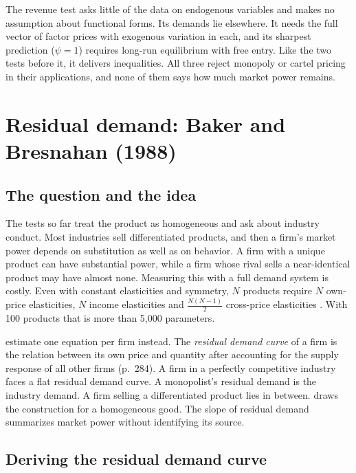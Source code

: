  The revenue test asks little of the data on endogenous variables and makes no
assumption about functional forms. Its demands lie elsewhere. It needs the full vector of factor prices with
exogenous variation in each, and its sharpest prediction ($\psi = 1$) requires long-run equilibrium with free
entry. Like the two tests before it, it delivers inequalities. All three reject monopoly or cartel pricing in
their applications, and none of them says how much market power remains.

\section{Residual demand: Baker and Bresnahan (1988)}\label{sec:03-residual-demand}

\subsection{The question and the idea}\label{sec:03-rd-idea}

The tests so far treat the product as homogeneous and ask about industry conduct. Most industries sell
differentiated products, and then a firm's market power depends on substitution as well as on behavior. A
firm with a unique product can have substantial power, while a firm whose rival sells a near-identical
product may have almost none. Measuring this with a full demand system is costly. Even with constant
elasticities and symmetry, $N$ products require $N$ own-price elasticities, $N$ income elasticities and
$\frac{N(N - 1)}{2}$ cross-price elasticities \citep[p.~1045]{Bresnahan1989}. With 100 products that is more
than 5,000 parameters.

\citet{BakerBresnahan1988} estimate one equation per firm instead. The \emph{residual demand curve} of a firm
is the relation between its own price and quantity after accounting for the supply response of all other
firms (p.~284). A firm in a perfectly competitive industry faces a flat residual demand curve. A monopolist's
residual demand is the industry demand. A firm selling a differentiated product lies in between.
 draws the construction for a homogeneous good. The slope of residual demand
summarizes market power without identifying its source.

\subsection{Deriving the residual demand curve}\label{sec:03-rd-model}

